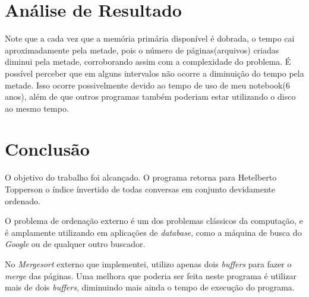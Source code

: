 \documentclass[
	12pt,
	a4paper,
	onepage,
	brazil
]{article}
\begin{document}
	\section{Análise de Resultado}
	
	Note que a cada vez que a memória primária disponível é dobrada, o tempo cai aproximadamente pela metade, pois o número de páginas(arquivos) criadas diminui pela metade, corroborando assim com a complexidade do problema. É possível perceber que em alguns intervalos não ocorre a diminuição do tempo pela metade. Isso ocorre possivelmente devido ao tempo de uso de meu notebook(6 anos), além de que outros programas também poderiam estar utilizando o disco ao mesmo tempo.
	
	\section{Conclusão}
	
	O objetivo do trabalho foi alcançado. O programa retorna para Hetelberto Topperson o índice ínvertido de todas conversas em conjunto devidamente ordenado.
	
	O problema de ordenação externo é um dos problemas clássicos da computação, e é amplamente utilizando em aplicações de \textit{database}, como a máquina de busca do \textit{Google} ou de qualquer outro buscador.
	
	No \textit{Mergesort} externo que implementei, utilizo apenas dois \textit{buffers} para fazer o \textit{merge} das páginas. Uma melhora que poderia ser feita neste programa é utilizar mais de dois \textit{buffers}, diminuindo mais ainda o tempo de execução do programa.
	
	\nocite{*}
	
	\printbibliography[title=Referências]
\end{document}
